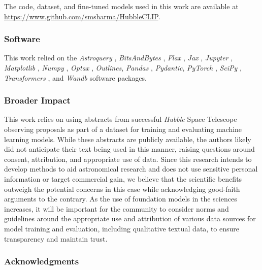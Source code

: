 \documentclass[10pt]{article} %
\newcommand{\package}[1]{\textsl{#1}\xspace}
\newcommand{\hubble}{\emph{Hubble}\xspace}
\begin{document}
The code, dataset, and fine-tuned models used in this work are available at \url{https://www.github.com/smsharma/HubbleCLIP}.

\subsubsection*{Software}

This work relied on the \package{Astroquery} \citep{2019AJ....157...98G}, \package{BitsAndBytes} \citep{dettmers2022llmint8}, \package{Flax} \citep{flax2020github}, \package{Jax} \citep{jax2018github}, \package{Jupyter} \citep{Kluyver2016jupyter}, \package{Matplotlib} \citep{Hunter:2007}, \package{Numpy} \citep{harris2020array}, \package{Optax} \citep{deepmind2020jax}, \package{Outlines}, \package{Pandas} \citep{2020SciPy-NMeth}, \package{Pydantic}, \package{PyTorch} \citep{paszke2019pytorch}, \package{SciPy} \citep{2020SciPy-NMeth}, \package{Transformers} \citep{wolf2019huggingface}, and \package{Wandb} \citep{wandb} software packages.


\subsubsection*{Broader Impact}

This work relies on using abstracts from successful \hubble Space Telescope observing proposals as part of a dataset for training and evaluating machine learning models. While these abstracts are publicly available, the authors likely did not anticipate their text being used in this manner, raising questions around consent, attribution, and appropriate use of data. Since this research intends to develop methods to aid astronomical research and does not use sensitive personal information or target commercial gain, we believe that the scientific benefits outweigh the potential concerns in this case while acknowledging good-faith arguments to the contrary. As the use of foundation models in the sciences increases, it will be important for the community to consider norms and guidelines around the appropriate use and attribution of various data sources for model training and evaluation, including qualitative textual data, to ensure transparency and maintain trust.

\subsubsection*{Acknowledgments}
\end{document}
